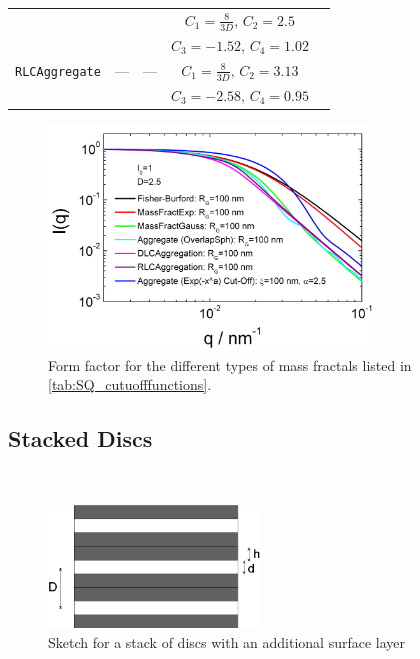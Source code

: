 \begin{table}[htb]
\begin{tabular}{|c|c|c|c|c|}
                                          & & & $\scriptstyle C_1=\frac{8}{3D}, \, C_2=2.5$ & \\
                                          & & & $\scriptstyle C_3=-1.52, \, C_4=1.02$ & \\[3mm]
   {\tt \scriptsize RLCAggregate} & --- & --- & $\scriptstyle C_1=\frac{8}{3D}, \, C_2=3.13$ & \\
                                          & & & $\scriptstyle C_3=-2.58, \, C_4=0.95$ & \cite{Lin1990c}\\[3mm]
  \hline
\end{tabular}
\end{table}


\begin{figure}[htb]
\begin{center}
\includegraphics[width=0.768\textwidth]{../images/form_factor/cluster/AggregateComparison.png}
\end{center}
\caption{Form factor for the different types of mass fractals listed in \ref{tab:SQ_cutuofffunctions}.}
\label{fig:FFCluster}
\end{figure}



\clearpage
\subsection{Stacked Discs}
\label{sect:StackedDiscs}
~\\

\begin{figure}[htb]
\begin{center}
\includegraphics[width=0.5\textwidth]{../images/form_factor/cluster/stackdiscs.png}
\end{center}
\caption{Sketch for a stack of discs with an additional surface layer}
\label{stackeddiscs}
\end{figure}



